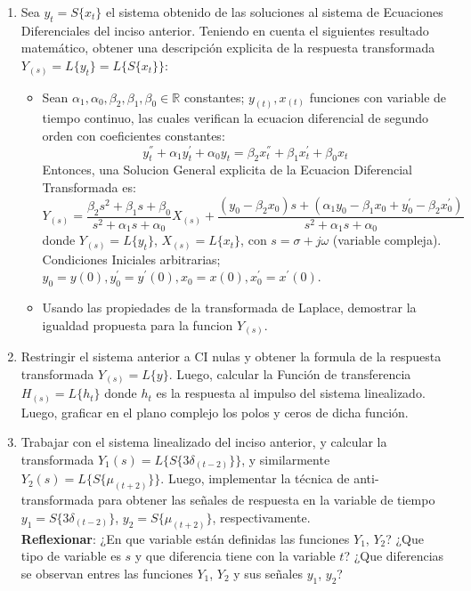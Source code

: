 \documentclass[12pt,a4paper]{report}
\begin{document}
\begin{enumerate}[label=\alph*)]
  \item Sea $y_t = S\{x_t\}$ el sistema obtenido de las soluciones al sistema de Ecuaciones Diferenciales del inciso
    anterior. Teniendo en cuenta el siguientes resultado matemático, obtener una descripción explicita de la respuesta
    transformada $Y_{(s)} = L\{y_t\} = L\{S\{x_t\}\}$:
  \begin{itemize}
    \item Sean $\alpha_1, \alpha_0, \beta_2, \beta_1, \beta_0 \in \mathbb{R}$ constantes; $y_{(t)}, x_{(t)}$ funciones
      con variable de tiempo continuo, las cuales verifican la ecuacion diferencial de segundo orden con coeficientes
      constantes:
      $$y_t^{''} + \alpha_1 y_t^{'} + \alpha_0 y_t = \beta_2 x_t^{''} + \beta_1 x_t^{'} + \beta_0 x_t$$
      Entonces, una Solucion General explicita de la Ecuacion Diferencial Transformada es:
      $$Y_{(s)} = \frac{\beta_2 s^2 + \beta_1 s + \beta_0}{s^2 + \alpha_1 s + \alpha_0}X_{(s)} + \frac{(y_0 - \beta_2 x_0)
        s + (\alpha_1 y_0 - \beta_1 x_0 + y_0^{'} - \beta_2 x_0^{'})}{s^2 + \alpha_1 s + \alpha_0}$$
      donde $Y_{(s)} = L\{y_t\}$, $X_{(s)} = L\{x_t\}$, con $s = \sigma + j \omega$ (variable compleja). Condiciones
      Iniciales arbitrarias; $y_0 = y(0), y_0^{'} = y^{'}(0), x_0 = x(0), x_0^{'} = x^{'}(0)$.
    \item Usando las propiedades de la transformada de Laplace, demostrar la igualdad propuesta para la funcion
     $Y_{(s)}$.
  \end{itemize}

  \item Restringir el sistema anterior a CI nulas y obtener la formula de la respuesta transformada $Y_{(s)} = L\{y\}$.
    Luego, calcular la Función de transferencia $H_{(s)} = L\{h_t\}$ donde $h_t$ es la respuesta al impulso del sistema
    linealizado. Luego, graficar en el plano complejo los polos y ceros de dicha función.

  \item Trabajar con el sistema linealizado del inciso anterior, y calcular la transformada
    $Y_1(s) = L\{S\{3\delta_{(t-2)}\}\}$, y similarmente $Y_2(s) = L\{S\{\mu_{(t+2)}\}\}$. Luego, implementar la técnica
    de anti-transformada para obtener las señales de respuesta en la variable de tiempo $y_1 = S\{3\delta_{(t-2)}\}$,
    $y_2 = S\{\mu_{(t+2)}\}$, respectivamente.\\
    \textbf{Reflexionar}: ¿En que variable están definidas las funciones $Y_1$, $Y_2$? ¿Que tipo de variable es $s$ y que
    diferencia tiene con la variable $t$? ¿Que diferencias se observan entres las funciones $Y_1$, $Y_2$ y sus señales
    $y_1$, $y_2$?


\end{enumerate}
\end{document}

